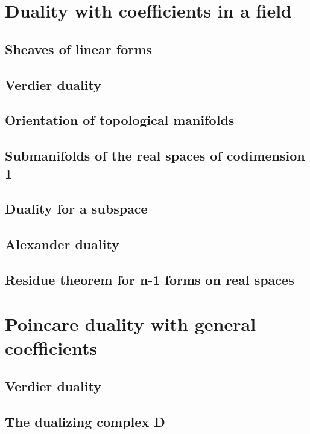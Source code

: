 \documentclass[5pt]{article}
\theoremstyle{definition}
\theoremstyle{remark}
\begin{document}
	\section{Duality with coefficients in a field}
	
	\subsection{Sheaves of linear forms}
	
	\subsection{Verdier duality}
	
	\subsection{Orientation of topological manifolds}
	
	\subsection{Submanifolds of the real spaces of codimension 1}
	
	\subsection{Duality for a subspace}
	
	\subsection{Alexander duality}
	
	\subsection{Residue theorem for n-1 forms on real spaces}	
	
	\newpage 
	
	\section{Poincare duality with general coefficients}
	
	\subsection{Verdier duality}
	
	\subsection{The dualizing complex D}
	
\end{document}
